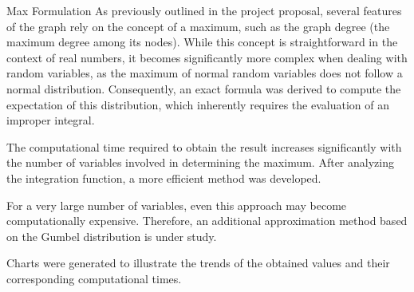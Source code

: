 \begin{projsection}{Max Formulation}
	As previously outlined in the project proposal, several features of the graph rely on the concept of a maximum, such as the graph degree (the maximum degree among its nodes).
	While this concept is straightforward in the context of real numbers, it becomes significantly more complex when dealing with random variables, as the maximum of normal random variables does not follow a normal distribution. Consequently, an exact formula was derived to compute the expectation of this distribution, which inherently requires the evaluation of an improper integral.
	
	The computational time required to obtain the result increases significantly with the number of variables involved in determining the maximum.
	After analyzing the integration function, a more efficient method was developed.
	
	For a very large number of variables, even this approach may become computationally expensive. Therefore, an additional approximation method based on the Gumbel distribution is under study.
	
	Charts were generated to illustrate the trends of the obtained values and their corresponding computational times.
	
\end{projsection}

	
